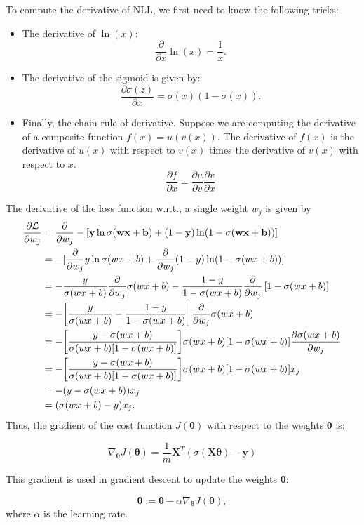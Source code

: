 To compute the derivative of NLL, we first need to know the following tricks:
\begin{itemize}
	\item The derivative of $\ln (x)$:
$$\frac{\partial }{\partial x}\ln (x) = \frac{1}{x}.$$
\item The derivative of the sigmoid is given by:
$$\frac{\partial \sigma(z)}{\partial x} = \sigma(x)(1-\sigma(x)).$$
\item Finally, the chain rule of derivative. Suppose we are computing the derivative of a composite function $f(x) = u(v(x))$. The derivative of $f(x)$ is the derivative of $u(x)$ with respect to $v(x)$ times the derivative of $v(x)$ with respect to $x$.
$$\frac{\partial f}{\partial x} = \frac{\partial u}{\partial v} \frac{\partial v}{\partial x}$$
\end{itemize}
The derivative of the loss function w.r.t., a single weight $w_j$ is given by
\begin{align*}
	\frac{\partial \mathcal{L}}{\partial w_j} &= \frac{\partial }{\partial w_j} -[{\mathbf{y}}\ln \sigma({\mathbf{w}}{\mathbf{x}} + {\mathbf{b}})+(1-{\mathbf{y}}) \ln (1-\sigma({\mathbf{w}}{\mathbf{x}}+{\mathbf{b}}))]\\
											  &=  -[\frac{\partial }{\partial w_j}y\ln \sigma(wx + b)+\frac{\partial }{\partial w_j}(1-y) \ln (1-\sigma(wx+b))]\\
											  &= -\frac{y}{\sigma(wx + b)}\frac{\partial }{\partial w_j}\sigma(wx + b) - \frac{1-y}{1-\sigma(wx+b)} \frac{\partial }{\partial w_j}\left[1-\sigma(wx+b)\right]\\
											  &= -\bigg[\frac{y}{\sigma(wx + b)}-\frac{1-y}{1-\sigma(wx + b)}\bigg]\frac{\partial }{\partial w_j}\sigma(wx + b)\\
											  &= -\bigg[\frac{y-\sigma(wx + b)}{\sigma(wx + b)[1-\sigma(wx + b)]}\bigg]\sigma(wx + b)[1-\sigma(wx + b)]\frac{\partial \sigma(wx + b)}{\partial w_j}\\
											  &= -\bigg[\frac{y-\sigma(wx + b)}{\sigma(wx + b)[1-\sigma(wx + b)]}\bigg]\sigma(wx + b)[1-\sigma(wx + b)]x_j\\ 
											  &= -( y-\sigma(wx + b) )x_j\\
											  &= ( \sigma(wx + b)-y )x_j.
\end{align*}
Thus, the gradient of the cost function $J(\boldsymbol{\theta})$ with respect to the weights $\boldsymbol{\theta}$ is:

\[
\nabla_{\boldsymbol{\theta}} J(\boldsymbol{\theta}) = \frac{1}{m} \mathbf{X}^T (\sigma(\mathbf{X} \boldsymbol{\theta}) - \mathbf{y})
\]

This gradient is used in gradient descent to update the weights $\boldsymbol{\theta}$:

\[
\boldsymbol{\theta} := \boldsymbol{\theta} - \alpha \nabla_{\boldsymbol{\theta}} J(\boldsymbol{\theta}),
\]
where $\alpha$ is the learning rate.

